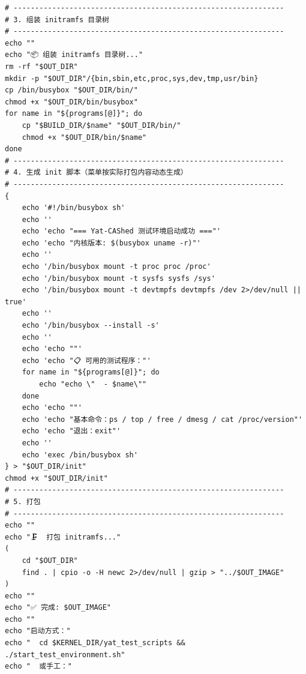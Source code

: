 \documentclass[10pt,a4paper]{article}
\newenvironment{yatpage}{\vspace*{0pt}}{\par}
\begin{document}
\begin{yatpage}
\begin{Verbatim}[fontsize=\fontsize{8.2}{9.8}\selectfont]
# ---------------------------------------------------------------
# 3. 组装 initramfs 目录树
# ---------------------------------------------------------------
echo ""
echo "📦 组装 initramfs 目录树..."
rm -rf "$OUT_DIR"
mkdir -p "$OUT_DIR"/{bin,sbin,etc,proc,sys,dev,tmp,usr/bin}
cp /bin/busybox "$OUT_DIR/bin/"
chmod +x "$OUT_DIR/bin/busybox"
for name in "${programs[@]}"; do
    cp "$BUILD_DIR/$name" "$OUT_DIR/bin/"
    chmod +x "$OUT_DIR/bin/$name"
done
# ---------------------------------------------------------------
# 4. 生成 init 脚本（菜单按实际打包内容动态生成）
# ---------------------------------------------------------------
{
    echo '#!/bin/busybox sh'
    echo ''
    echo 'echo "=== Yat-CAShed 测试环境启动成功 ==="'
    echo 'echo "内核版本: $(busybox uname -r)"'
    echo ''
    echo '/bin/busybox mount -t proc proc /proc'
    echo '/bin/busybox mount -t sysfs sysfs /sys'
    echo '/bin/busybox mount -t devtmpfs devtmpfs /dev 2>/dev/null || true'
    echo ''
    echo '/bin/busybox --install -s'
    echo ''
    echo 'echo ""'
    echo 'echo "📋 可用的测试程序："'
    for name in "${programs[@]}"; do
        echo "echo \"  - $name\""
    done
    echo 'echo ""'
    echo 'echo "基本命令：ps / top / free / dmesg / cat /proc/version"'
    echo 'echo "退出：exit"'
    echo ''
    echo 'exec /bin/busybox sh'
} > "$OUT_DIR/init"
chmod +x "$OUT_DIR/init"
# ---------------------------------------------------------------
# 5. 打包
# ---------------------------------------------------------------
echo ""
echo "🗜️  打包 initramfs..."
(
    cd "$OUT_DIR"
    find . | cpio -o -H newc 2>/dev/null | gzip > "../$OUT_IMAGE"
)
echo ""
echo "✅ 完成: $OUT_IMAGE"
echo ""
echo "启动方式："
echo "  cd $KERNEL_DIR/yat_test_scripts && ./start_test_environment.sh"
echo "  或手工："
\end{Verbatim}
\end{yatpage}
\newpage
\end{document}
